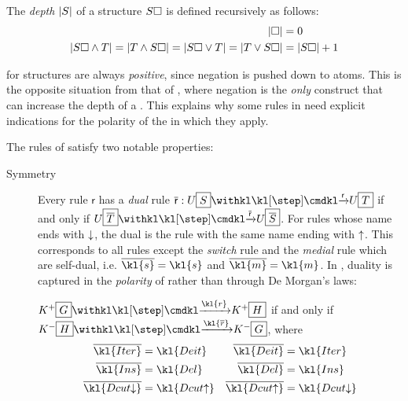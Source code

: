 \begin{scope}
\begin{definition}[Depth]
  The \emph{depth} $\left|S\right|$ of a structure  $S\square$ is defined
  recursively as follows:
  \begin{align*}
    \left|\square\right| &= 0 \\
    \left|S\square \land T\right| = \left|T \land S\square\right| = \left|S\square \lor T\right| = \left|T \lor S\square\right| &= \left|S\square\right| + 1
  \end{align*}
\end{definition}

\begin{remark}
   for structures are always \emph{positive}, since negation is pushed
down to atoms. This is the opposite situation from that of , where
negation is the \emph{only} construct that can increase the depth of a .
This explains why some rules in  need explicit indications for the
polarity of the  in which they apply.
\end{remark}

The rules of  satisfy two notable properties:
\begin{description}
  \item[Symmetry] 
    Every rule $\mathsf{r}$ has a \emph{dual} rule $\dmdual{\mathsf{r}} :
    U\select{S} \xstep{\mathsf{r}} U\select{T}$ if and only if
    $U\select{\dmdual{T}} \xstep{\dmdual{\mathsf{r}}} U\select{\dmdual{S}}$. For
    rules whose name ends with $\downarrow$, the dual is the rule with the same name
    ending with $\uparrow$. This corresponds to all rules except the \emph{switch}
    rule  and the \emph{medial} rule  which are self-dual, i.e.
    $\dmdual{\kl{s}} = \kl{s}$ and $\dmdual{\kl{m}} = \kl{m}$. In ,
    duality is captured in the \emph{polarity} of  rather than through
    De Morgan's laws:
    
    \begin{fact}[Duality]
      $K^+\select{G} \xstep{\kl{r}} K^+\select{H}$
      if and only if $K^-\select{H} \xstep{\kl{\dmdual{r}}} K^-\select{G}$, where
      \begin{align*}
        \dmdual{\kl{Iter}} &= \kl{Deit} & \dmdual{\kl{Deit}} &= \kl{Iter} \\
        \dmdual{\kl{Ins}} &= \kl{Del} & \dmdual{\kl{Del}} &= \kl{Ins} \\
        \dmdual{\kl{Dcut{\da}}} &= \kl{Dcut{\ua}} & \dmdual{\kl{Dcut{\ua}}} &= \kl{Dcut{\da}}
      \end{align*}
    \end{fact}


\end{description}
\end{scope}
